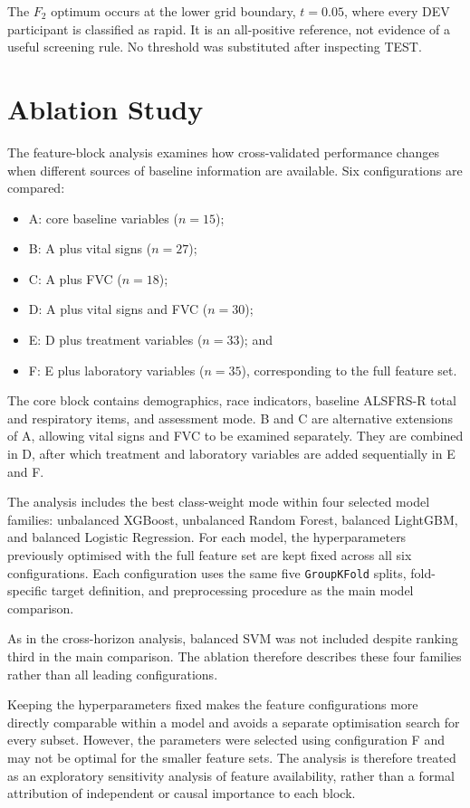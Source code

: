 The $F_2$ optimum occurs at the lower grid boundary, $t=0.05$, where every DEV participant is classified as rapid. It is an all-positive reference, not evidence of a useful screening rule. No threshold was substituted after inspecting TEST.

\section{Ablation Study}
\label{sec:methods_ablation}
The feature-block analysis examines how cross-validated performance changes when different sources of baseline information are available. Six configurations are compared:
\begin{itemize}
  \item A: core baseline variables ($n\!=\!15$);
  \item B: A plus vital signs ($n\!=\!27$);
  \item C: A plus \gls{FVC} ($n\!=\!18$);
  \item D: A plus vital signs and \gls{FVC} ($n\!=\!30$);
  \item E: D plus treatment variables ($n\!=\!33$); and
  \item F: E plus laboratory variables ($n\!=\!35$), corresponding to the full feature set.
\end{itemize}
The core block contains demographics, race indicators, baseline \gls{ALSFRS-R} total and respiratory items, and assessment mode. B and C are alternative extensions of A, allowing vital signs and FVC to be examined separately. They are combined in D, after which treatment and laboratory variables are added sequentially in E and F.

The analysis includes the best class-weight mode within four selected model families: unbalanced XGBoost, unbalanced Random Forest, balanced LightGBM, and balanced Logistic Regression. For each model, the hyperparameters previously optimised with the full feature set are kept fixed across all six configurations. Each configuration uses the same five \texttt{GroupKFold} splits, fold-specific target definition, and preprocessing procedure as the main model comparison.

As in the cross-horizon analysis, balanced SVM was not included despite ranking third in the main comparison. The ablation therefore describes these four families rather than all leading configurations.

Keeping the hyperparameters fixed makes the feature configurations more directly comparable within a model and avoids a separate optimisation search for every subset. However, the parameters were selected using configuration F and may not be optimal for the smaller feature sets. The analysis is therefore treated as an exploratory sensitivity analysis of feature availability, rather than a formal attribution of independent or causal importance to each block.

